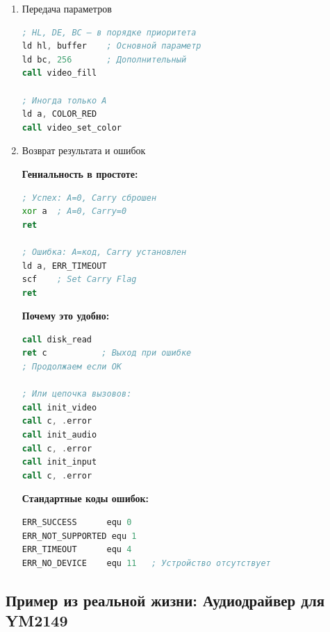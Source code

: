 \documentclass[11pt,a4paper]{scrartcl}
\begin{document}
\begin{enumerate}
\item Передача параметров
\label{sec:org0990e49}

\begin{lstlisting}[language=asm,numbers=none]
; HL, DE, BC — в порядке приоритета
ld hl, buffer    ; Основной параметр
ld bc, 256       ; Дополнительный
call video_fill

; Иногда только A
ld a, COLOR_RED
call video_set_color
\end{lstlisting}
\item Возврат результата и ошибок
\label{sec:orgd4c617c}

\textbf{Гениальность в простоте:}

\begin{lstlisting}[language=asm,numbers=none]
; Успех: A=0, Carry сброшен
xor a  ; A=0, Carry=0
ret

; Ошибка: A=код, Carry установлен
ld a, ERR_TIMEOUT
scf    ; Set Carry Flag
ret
\end{lstlisting}

\textbf{Почему это удобно:}

\begin{lstlisting}[language=asm,numbers=none]
call disk_read
ret c           ; Выход при ошибке
; Продолжаем если OK

; Или цепочка вызовов:
call init_video
call c, .error
call init_audio  
call c, .error
call init_input
call c, .error
\end{lstlisting}

\textbf{Стандартные коды ошибок:}

\begin{lstlisting}[language=asm,numbers=none]
ERR_SUCCESS      equ 0
ERR_NOT_SUPPORTED equ 1
ERR_TIMEOUT      equ 4
ERR_NO_DEVICE    equ 11   ; Устройство отсутствует
\end{lstlisting}
\end{enumerate}
\subsection{Пример из реальной жизни: Аудиодрайвер для YM2149}
\label{sec:org7a683d1}
\end{document}
